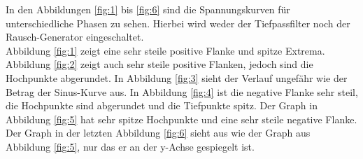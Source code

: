In den Abbildungen \ref{fig:1} bis \ref{fig:6} sind die Spannungskurven für unterschiedliche Phasen
zu sehen. Hierbei wird weder der Tiefpassfilter noch der Rausch-Generator eingeschaltet. \\
Abbildung \ref{fig:1} zeigt eine sehr steile positive Flanke und spitze Extrema. Abbildung \ref{fig:2}
zeigt auch sehr steile positive Flanken, jedoch sind die Hochpunkte abgerundet. In Abbildung \ref{fig:3}
sieht der Verlauf ungefähr wie der Betrag der Sinus-Kurve aus. In Abbildung \ref{fig:4}
ist die negative Flanke sehr steil, die Hochpunkte sind abgerundet und die Tiefpunkte spitz.
Der Graph in Abbildung \ref{fig:5} hat sehr spitze Hochpunkte und eine sehr steile negative Flanke.
Der Graph in der letzten Abbildung \ref{fig:6} sieht aus wie der Graph aus Abbildung \ref{fig:5}, nur
das er an der y-Achse gespiegelt ist.

\newpage

